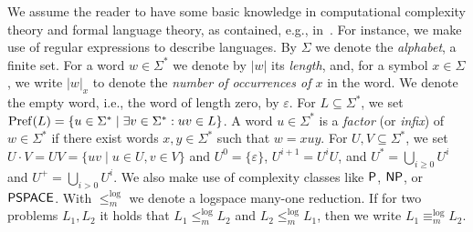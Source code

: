 




We assume the reader to have some basic knowledge in computational complexity theory and formal language theory, as contained, e.g., in~\cite{HopUll79}. For instance, we make use of  regular expressions to describe languages.
By $\Sigma$ we denote the \emph{alphabet}, a finite set.
For a word $w \in \Sigma^*$ we denote by $|w|$ its \emph{length},
and, for a symbol $x \in \Sigma$, we write $|w|_x$ to denote the \emph{number of occurrences of $x$}
in the word. We denote the empty word, i.e., the word of length zero, by $\varepsilon$.
For $L \subseteq \Sigma^*$, we set $\operatorname{Pref}(L) = \{ u \in \Sigma^* \mid \exists v \in \Sigma^* : uv \in L \}$.
A word $u \in \Sigma^*$ is a \emph{factor} (or \emph{infix}) of $w \in \Sigma^*$ if there exist words $x,y \in \Sigma^*$ such that $w = xuy$. 
For $U, V \subseteq \Sigma^*$, we set $U\cdot V = UV = \{ uv \mid u \in U, v \in V \}$
and 
$U^0 = \{ \varepsilon \}$, $U^{i+1} = U^i U$, 
and $U^* = \bigcup_{i \ge 0} U^i$ and $U^+ = \bigcup_{i > 0} U^i$.
We also make use of complexity classes like $\textsf{P}$, $\textsf{NP}$, or $\textsf{PSPACE}$.
With  $\leq^{\log}_m$ we denote a logspace many-one reduction.
If for two problems $L_1, L_2$ it holds that $L_1 \leq^{\log}_m L_2$ and $L_2 \leq^{\log}_m L_1$, then we write $L_1 \equiv^{\log}_m L_2$.



